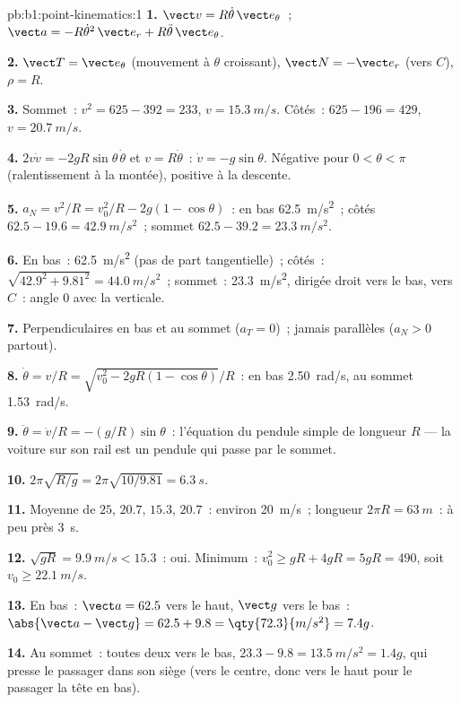 \begin{solution}{pb:b1:point-kinematics:1}
\textbf{1.} $\vect v = R\dot\theta\,\vect e_\theta$~; $\vect a = -R\dot\theta^2
\,\vect e_r + R\ddot\theta\,\vect e_\theta$.

\textbf{2.} $\vect T = \vect e_\theta$ (mouvement à $\theta$ croissant),
$\vect N = -\vect e_r$ (vers $C$), $\rho = R$.

\textbf{3.} Sommet~: $v^2 = 625 - 392 = 233$, $v = \qty{15.3}{m/s}$. Côtés~:
$625 - 196 = 429$, $v = \qty{20.7}{m/s}$.

\textbf{4.} $2v\dot v = -2gR\sin\theta\,\dot\theta$ et $v = R\dot\theta$~:
$\dot v = -g\sin\theta$. Négative pour $0 < \theta < \pi$ (ralentissement
à la montée), positive à la descente.

\textbf{5.} $a_N = v^2/R = v_0^2/R - 2g(1 - \cos\theta)$~: en bas
\qty{62.5}{m/s^2}~; côtés $62.5 - 19.6 = \qty{42.9}{m/s^2}$~; sommet $62.5 -
39.2 = \qty{23.3}{m/s^2}$.

\textbf{6.} En bas~: \qty{62.5}{m/s^2} (pas de part tangentielle)~; côtés~:
$\sqrt{42.9^2 + 9.81^2} = \qty{44.0}{m/s^2}$~; sommet~: \qty{23.3}{m/s^2},
dirigée droit vers le bas, vers $C$~: angle $0$ avec la verticale.

\textbf{7.} Perpendiculaires en bas et au sommet ($a_T = 0$)~; jamais
parallèles ($a_N > 0$ partout).

\textbf{8.} $\dot\theta = v/R = \sqrt{v_0^2 - 2gR(1 - \cos\theta)}/R$~:
en bas \qty{2.50}{rad/s}, au sommet \qty{1.53}{rad/s}.

\textbf{9.} $\ddot\theta = \dot v/R = -(g/R)\sin\theta$~: l'équation du
pendule simple de longueur $R$ --- la voiture sur son rail est un
pendule qui passe par le sommet.

\textbf{10.} $2\pi\sqrt{R/g} = 2\pi\sqrt{10/9.81} = \qty{6.3}{s}$.

\textbf{11.} Moyenne de $25$, $20.7$, $15.3$, $20.7$~: environ \qty{20}{m/s}~;
longueur $2\pi R = \qty{63}{m}$~: à peu près \qty{3}{s}.

\textbf{12.} $\sqrt{gR} = \qty{9.9}{m/s} < 15.3$~: oui. Minimum~: $v_0^2 \geq
gR + 4gR = 5gR = 490$, soit $v_0 \geq \qty{22.1}{m/s}$.

\textbf{13.} En bas~: $\vect a = 62.5$ vers le haut, $\vect g$ vers le bas~:
$\abs{\vect a - \vect g} = 62.5 + 9.8 = \qty{72.3}{m/s^2} = 7.4g$.

\textbf{14.} Au sommet~: toutes deux vers le bas, $23.3 - 9.8 = \qty{13.5}{m/s^2} = 1.4g$,
qui presse le passager dans son siège (vers le centre, donc vers le haut
pour le passager la tête en bas).


\end{solution}
